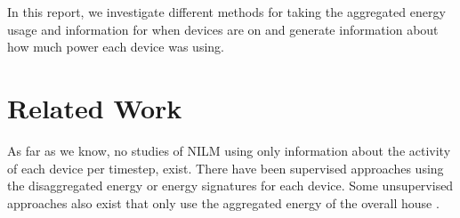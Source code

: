 \documentclass{article}
\begin{document}
In this report, we investigate different methods for taking the aggregated energy usage and information for when devices are on and generate information about how much power each device was using.



\section{Related Work}

As far as we know, no studies of NILM using only information about the activity of each device per timestep, exist.
There have been supervised approaches using the disaggregated energy\cite{Kelly} or energy signatures \cite{Parson} for each device.
Some unsupervised approaches also exist that only use the aggregated energy of the overall house \cite{Kolter}.



\end{document}
